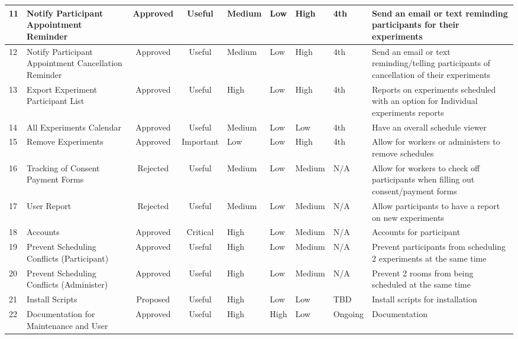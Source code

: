 \begin{table}[!h]
\begin{tabular}{|p{.5cm}|p{2.5cm}|c|c|p{1.25cm}|p{1cm}|p{1.25cm}|p{1cm}|p{3.75cm}|}
        \hline
        11 & Notify Participant Appointment Reminder & Approved & Useful & Medium & Low & High & 4th & Send an email or text reminding participants for their experiments \\
        \hline
         12 & Notify Participant Appointment Cancellation Reminder & Approved & Useful & Medium & Low & High & 4th & Send an email or text reminding/telling participants of cancellation of their experiments \\
        \hline
        13 & Export Experiment Participant List & Approved & Useful & High & Low & High & 4th & Reports on experiments scheduled with an option for Individual experiments reports \\
        \hline
        14 & All Experiments Calendar & Approved & Useful & Medium & Low & Low & 4th & Have an overall schedule viewer \\
        \hline
        15 & Remove Experiments & Approved & Important & Low & Low & High & 4th & Allow for workers or administers to remove schedules \\
        \hline
        16 & Tracking of Consent Payment Forms & Rejected & Useful & Medium & Low & Medium & N/A & Allow for workers to check off participants when filling out consent/payment forms \\
        \hline
        17 & User Report & Rejected & Useful & Medium & Low & Medium & N/A & Allow participants to have a report on new experiments \\
        \hline
        18 & Accounts & Approved & Critical & High & Low & Medium & N/A & Accounts for participant \\
        \hline
        19 & Prevent Scheduling Conflicts (Participant) & Approved & Useful & High & Low & Medium & N/A & Prevent participants from scheduling 2 experiments at the same time \\
        \hline
        20 & Prevent Scheduling Conflicts (Administer) & Approved & Useful & High & Low & Medium & N/A & Prevent 2 rooms from being scheduled at the same time \\
        \hline
        21 & Install Scripts & Proposed & Useful & High & Low & Low & TBD & Install scripts for installation \\
        \hline
        22 & Documentation for Maintenance and User & Approved & Useful & High & High & Low & Ongoing & Documentation \\
        \hline
    \end{tabular}
\end{table}
\clearpage

